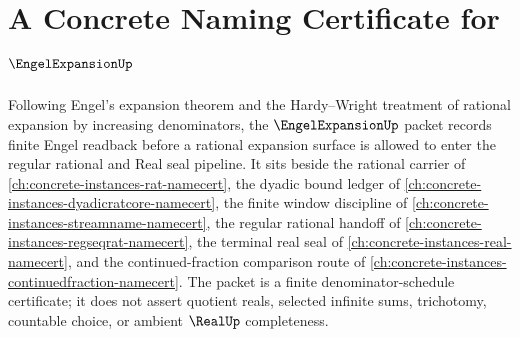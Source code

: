 \chapter{A Concrete Naming Certificate for $\EngelExpansionUp$}
\label{ch:concrete-instances-engel-expansion-namecert}

Following Engel's expansion theorem and the Hardy--Wright treatment of rational expansion by increasing denominators, the $\EngelExpansionUp$ packet records finite Engel readback before a rational expansion surface is allowed to enter the regular rational and Real seal pipeline. It sits beside the rational carrier of \autoref{ch:concrete-instances-rat-namecert}, the dyadic bound ledger of \autoref{ch:concrete-instances-dyadicratcore-namecert}, the finite window discipline of \autoref{ch:concrete-instances-streamname-namecert}, the regular rational handoff of \autoref{ch:concrete-instances-regseqrat-namecert}, the terminal real seal of \autoref{ch:concrete-instances-real-namecert}, and the continued-fraction comparison route of \autoref{ch:concrete-instances-continuedfraction-namecert}. The packet is a finite denominator-schedule certificate; it does not assert quotient reals, selected infinite sums, trichotomy, countable choice, or ambient $\RealUp$ completeness.

